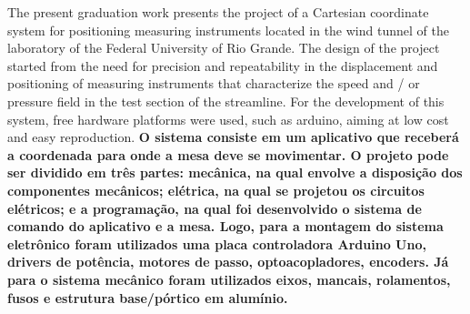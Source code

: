 The present graduation work presents the project of a Cartesian coordinate system for positioning 
measuring instruments located in the wind tunnel of the laboratory of the Federal University of 
Rio Grande. The design of the project started from the need for precision and repeatability in 
the displacement and positioning of measuring instruments that characterize the speed and / or pressure 
field in the test section of the streamline. For the development of this system, free hardware platforms 
were used, such as arduino, aiming at low cost and easy reproduction. \textbf{O sistema consiste em um aplicativo 
que receberá a coordenada para onde a mesa deve se movimentar. O projeto pode ser dividido em três partes: 
mecânica, na qual envolve a disposição dos componentes mecânicos; elétrica, na qual se projetou os 
circuitos elétricos; e a programação, na qual foi desenvolvido o sistema de comando do aplicativo e 
a mesa. Logo, para a montagem do sistema eletrônico foram utilizados uma placa controladora 
Arduino Uno, drivers de potência, motores de passo, optoacopladores, encoders. Já para o sistema 
mecânico foram utilizados eixos, mancais, rolamentos, fusos e  estrutura base/pórtico em alumínio.}